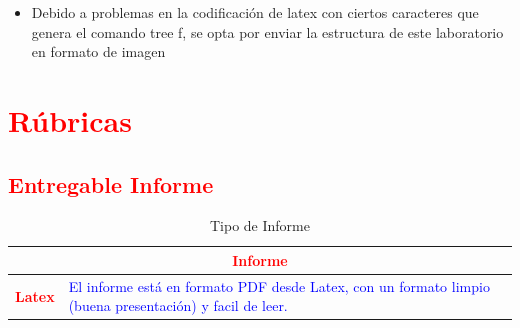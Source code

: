 \documentclass{article}
\begin{document}
	\begin{itemize}	
		\item Debido a problemas en la codificación de latex con ciertos caracteres que genera el comando tree f, se opta 
		por enviar la estructura de este laboratorio en formato de imagen
	\end{itemize}
	

   
	
	\section{\textcolor{red}{Rúbricas}}
	
	\subsection{\textcolor{red}{Entregable Informe}}
	\begin{table}[H]
		\caption{Tipo de Informe}
		\setlength{\tabcolsep}{0.5em} %
		{\renewcommand{\arraystretch}{1.5}%
			\begin{tabular}{|p{3cm}|p{12cm}|}
				\hline
				\multicolumn{2}{|c|}{\textbf{\textcolor{red}{Informe}}}  \\
				\hline 
				\textbf{\textcolor{red}{Latex}} & \textcolor{blue}{El informe está en formato PDF desde Latex,  con un formato limpio (buena presentación) y facil de leer.}   \\ 
				\hline 
				
				
			\end{tabular}
		}
	\end{table}
	
	\clearpage
	
\end{document}
